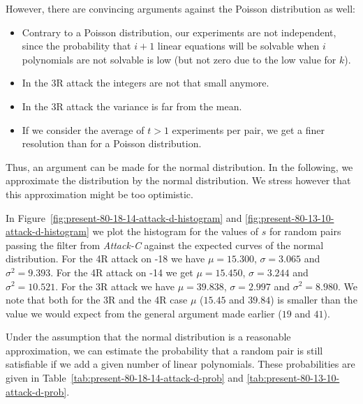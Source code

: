 However, there are convincing arguments against the Poisson distribution as well:
\begin{itemize}
 \item Contrary to a Poisson distribution, our experiments are not independent, since the probability that $i+1$ linear equations will be solvable when $i$ polynomials are not solvable is low (but not zero due to the low value for $k$).
 \item In the 3R attack the integers are not that small anymore. 
 \item In the 3R attack the variance is far from the mean.
 \item If we consider the average of $t>1$ experiments per pair, we get a finer resolution than for a Poisson distribution.
\end{itemize}

Thus, an argument can be made for the normal distribution. In the following, we approximate the distribution by the normal distribution. We stress however  that this approximation might be too optimistic.

In Figure~\ref{fig:present-80-18-14-attack-d-histogram} and \ref{fig:present-80-13-10-attack-d-histogram} we plot the histogram for the values of $s$ for random pairs passing the filter from \emph{Attack-C} against the expected curves of the normal distribution. For the 4R attack on -18 we have $\mu=15.300$, $\sigma=3.065$ and $\sigma^2=9.393$. For the 4R attack on -14 we get $\mu=15.450$, $\sigma=3.244$ and $\sigma^2=10.521$. For the 3R attack we have $\mu=39.838$, $\sigma=2.997$ and $\sigma^2=8.980$. We note that both for the 3R and the 4R case $\mu$ ($15.45$ and $39.84$) is smaller than the value we would expect from the general argument made earlier ($19$ and $41$).

Under the assumption that the normal distribution is a reasonable approximation, we can estimate the probability that a random pair is still satisfiable if we add a given number of linear polynomials. These probabilities are given in Table~\ref{tab:present-80-18-14-attack-d-prob} and \ref{tab:present-80-13-10-attack-d-prob}.

